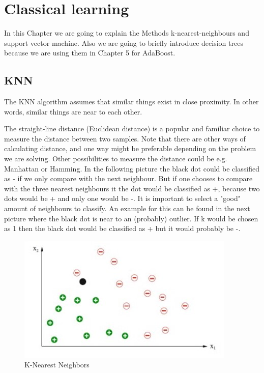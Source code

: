 \section{Classical learning}
In this Chapter we are going to explain the Methods k-nearest-neighbours and support vector machine. Also we are going to briefly introduce decision trees because we are using them in Chapter 5 for AdaBoost.


\subsection{KNN}
The KNN algorithm assumes that similar things exist in close proximity. In other words, similar things are near to each other.

The straight-line distance (Euclidean distance) is a popular and familiar choice to measure the distance between two samples.
Note that there are other ways of calculating distance, and one way might be preferable depending on the problem we are solving. Other possibilities to measure the distance could be e.g. Manhattan or Hamming.
In the following picture the black dot could be classified as - if we only compare with the next neighbour. But if one chooses to compare with the three nearest neighbours it the dot would be classified as +, because two dots would be + and only one would be -. It is important to select a "good" amount of neighbours to classify. An example for this can be found in the next picture where the black dot is near to an (probably) outlier. If k would be chosen as 1 then the black dot would be classified as + but it would probably be -.

\begin{figure}[hbtp]
	\centering
	\includegraphics[scale=0.8]{knn1}
	\caption{K-Nearest Neighbors}
	\label{fig:Datensatz - unbearbeitet}
\end{figure}

